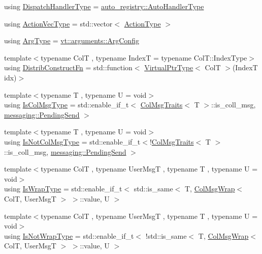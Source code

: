 \begin{DoxyCompactItemize}
\item 
using \hyperlink{structvt_1_1vrt_1_1collection_1_1_collection_manager_a0cfe02a0426e95ec9daa2ef7374e07c7}{Dispatch\+Handler\+Type} = \hyperlink{namespacevt_1_1auto__registry_ae295e18699146815bb7d7674594d95d7}{auto\+\_\+registry\+::\+Auto\+Handler\+Type}
\item 
using \hyperlink{structvt_1_1vrt_1_1collection_1_1_collection_manager_a51650235f0e53ae08381942eba822679}{Action\+Vec\+Type} = std\+::vector$<$ \hyperlink{namespacevt_ae0a5a7b18cc99d7b732cb4d44f46b0f3}{Action\+Type} $>$
\item 
using \hyperlink{structvt_1_1vrt_1_1collection_1_1_collection_manager_a51ba1b25f5c2f1f7ac5834fdbc85fa5c}{Arg\+Type} = \hyperlink{structvt_1_1arguments_1_1_arg_config}{vt\+::arguments\+::\+Arg\+Config}
\item 
{\footnotesize template$<$typename ColT , typename IndexT  = typename Col\+T\+::\+Index\+Type$>$ }\\using \hyperlink{structvt_1_1vrt_1_1collection_1_1_collection_manager_a7503830bc133013d542856fa39834dcc}{Distrib\+Construct\+Fn} = std\+::function$<$ \hyperlink{structvt_1_1vrt_1_1collection_1_1_collection_manager_a1da9015e52d6ecca955f57b59aab0b82}{Virtual\+Ptr\+Type}$<$ ColT $>$(IndexT idx)$>$
\item 
{\footnotesize template$<$typename T , typename U  = void$>$ }\\using \hyperlink{structvt_1_1vrt_1_1collection_1_1_collection_manager_a21c21612c806016788057aeab142af20}{Is\+Col\+Msg\+Type} = std\+::enable\+\_\+if\+\_\+t$<$ \hyperlink{structvt_1_1vrt_1_1collection_1_1_col_msg_traits}{Col\+Msg\+Traits}$<$ T $>$\+::is\+\_\+coll\+\_\+msg, \hyperlink{structvt_1_1messaging_1_1_pending_send}{messaging\+::\+Pending\+Send} $>$
\item 
{\footnotesize template$<$typename T , typename U  = void$>$ }\\using \hyperlink{structvt_1_1vrt_1_1collection_1_1_collection_manager_ae376deeefd4f89a0b1c93849977715d9}{Is\+Not\+Col\+Msg\+Type} = std\+::enable\+\_\+if\+\_\+t$<$!\hyperlink{structvt_1_1vrt_1_1collection_1_1_col_msg_traits}{Col\+Msg\+Traits}$<$ T $>$\+::is\+\_\+coll\+\_\+msg, \hyperlink{structvt_1_1messaging_1_1_pending_send}{messaging\+::\+Pending\+Send} $>$
\item 
{\footnotesize template$<$typename ColT , typename User\+MsgT , typename T , typename U  = void$>$ }\\using \hyperlink{structvt_1_1vrt_1_1collection_1_1_collection_manager_a1f91c97ed52237c3a3576dfbbe87c8f8}{Is\+Wrap\+Type} = std\+::enable\+\_\+if\+\_\+t$<$ std\+::is\+\_\+same$<$ T, \hyperlink{structvt_1_1vrt_1_1collection_1_1_col_msg_wrap}{Col\+Msg\+Wrap}$<$ ColT, User\+MsgT $>$ $>$\+::value, U $>$
\item 
{\footnotesize template$<$typename ColT , typename User\+MsgT , typename T , typename U  = void$>$ }\\using \hyperlink{structvt_1_1vrt_1_1collection_1_1_collection_manager_a18e3a17d9eb086c6c2f499242b7faa1e}{Is\+Not\+Wrap\+Type} = std\+::enable\+\_\+if\+\_\+t$<$ !std\+::is\+\_\+same$<$ T, \hyperlink{structvt_1_1vrt_1_1collection_1_1_col_msg_wrap}{Col\+Msg\+Wrap}$<$ ColT, User\+MsgT $>$ $>$\+::value, U $>$
\end{DoxyCompactItemize}

